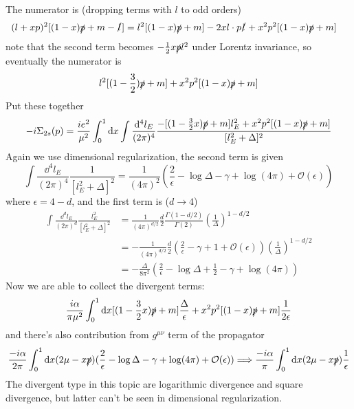 \documentclass{article}
\newcommand{\g}{\gamma}
\renewcommand{\a}{\alpha}
\newcommand{\ps}{\slashed p}
\begin{document}
\begin{enumerate}[\bf 1.]
  The numerator is (dropping terms with $l$ to odd orders)
  \begin{align*}
  (l+xp)^2[(1-x)\ps+m-\slashed l]&=l^2[(1-x)\ps+m]-2xl\cdot p\slashed l+x^2p^2[(1-x)\ps+m]
  \end{align*}
  note that the second term becomes $-\frac{1}{2}x\ps l^2$ under Lorentz invariance, so eventually the numerator is
  $$l^2[(1-\frac{3}{2})\ps+m]+x^2p^2[(1-x)\ps+m]$$
  Put these together
  $$-i\Sigma_{2s}(p)=\frac{ie^2}{\mu^2}\int_0^1\dd x\int\frac{\dd^4l_E}{(2\pi)^4} \frac{-[(1-\frac{3}{2}x)\ps+m]l_E^2+x^2p^2[(1-x)\ps+m]}{[l_E^2+\Delta]^2}$$
  Again we use dimensional regularization, the second term is given
  $$\int\frac{\dd^4l_E}{(2\pi)^4}\frac{1}{[l_E^2+\Delta]^2}=\frac{1}{(4\pi)^2}(\frac{2}{\epsilon}-\log{\Delta}-\g+\log{(4\pi)}+\mathcal{O}(\epsilon))$$
  where $\epsilon=4-d$, and the first term is ($d\rightarrow4$)
  \begin{align*}
	\int\frac{\dd^dl_E}{(2\pi)^d}\frac{l_E^2}{[l_E^2+\Delta]^2}&=\frac{1}{(4\pi)^{d/2}}\frac{d}{2}\frac{\Gamma(1-d/2)}{\Gamma(2)}(\frac{1}{\Delta})^{1-d/2}\\
	&=-\frac{1}{(4\pi)^{d/2}}\frac{d}{2}(\frac{2}{\epsilon}-\g+1+\mathcal{O}(\epsilon))(\frac{1}{\Delta})^{1-d/2}\\
	&=-\frac{\Delta}{8\pi^2}(\frac{2}{\epsilon}-\log\Delta+\frac{1}{2}-\g+\log(4\pi))
  \end{align*}
  Now we are able to collect the divergent terms:
  $$\frac{i\a}{\pi\mu^2}\int_0^1\dd x[(1-\frac{3}{2}x)\ps+m]\frac{\Delta}{\epsilon}+x^2p^2[(1-x)\ps+m]\frac{1}{2\epsilon}$$
  and there's also contribution from $g^{\mu\nu}$ term of the propagator
  $$\frac{-i\a}{2\pi}\int_0^1\dd x(2\mu-x\ps)(\frac{2}{\epsilon}-\log{\Delta}-\g+\log(4\pi)+\mathcal{O}(\epsilon))\Longrightarrow \frac{-i\a}{\pi}\int_0^1\dd x(2\mu-x\ps)\frac{1}{\epsilon}$$
  The divergent type in this topic are logarithmic divergence and square divergence, but latter can't be seen in dimensional regularization.








\end{enumerate}
\end{document}
